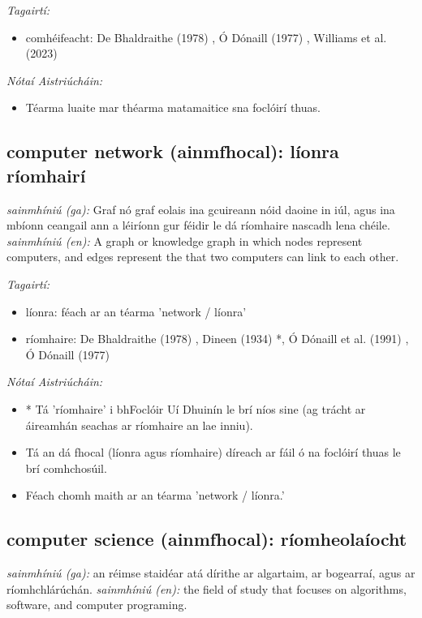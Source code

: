 \documentclass{article}
\begin{document}
 \noindent \textit{Tagairtí:}
\begin{itemize}
	\item comhéifeacht: De Bhaldraithe (1978) \cite{de-bhaldraithe}, Ó Dónaill (1977) \cite{odonaill}, Williams et al. (2023) \cite{storchiste}
\end{itemize}

 \noindent \textit{Nótaí Aistriúcháin:}
\begin{itemize}
	\item Téarma luaite mar théarma matamaitice sna foclóirí thuas.
\end{itemize}


\subsection*{computer network (ainmfhocal): líonra ríomhairí} 
 \noindent \textit{sainmhíniú (ga):} Graf nó graf eolais ina gcuireann nóid daoine in iúl, agus ina mbíonn ceangail ann a léiríonn gur féidir le dá ríomhaire nascadh lena chéile.
\newline\newline
 \noindent \textit{sainmhíniú (en):} A graph or knowledge graph in which nodes represent computers, and edges represent the that two computers can link to each other.
\newline

 \noindent \textit{Tagairtí:}
\begin{itemize}
	\item líonra: féach ar an téarma 'network / líonra'
	\item ríomhaire: De Bhaldraithe (1978) \cite{de-bhaldraithe}, Dineen (1934) \cite{dineen}*, Ó Dónaill et al. (1991) \cite{focloir-beag}, Ó Dónaill (1977) \cite{odonaill}
\end{itemize}

 \noindent \textit{Nótaí Aistriúcháin:}
\begin{itemize}
	\item * Tá 'ríomhaire' i bhFoclóir Uí Dhuinín le brí níos sine (ag trácht ar áireamhán seachas ar ríomhaire an lae inniu).
	\item Tá an dá fhocal (líonra agus ríomhaire) díreach ar fáil ó na foclóirí thuas le brí comhchosúil.
	\item Féach chomh maith ar an téarma 'network / líonra.'
\end{itemize}


\subsection*{computer science (ainmfhocal): ríomheolaíocht} 
 \noindent \textit{sainmhíniú (ga):} an réimse staidéar atá dírithe ar algartaim, ar bogearraí, agus ar ríomhchlárúchán.
\newline\newline
 \noindent \textit{sainmhíniú (en):} the field of study that focuses on algorithms, software, and computer programing.
\newline
\end{document}
